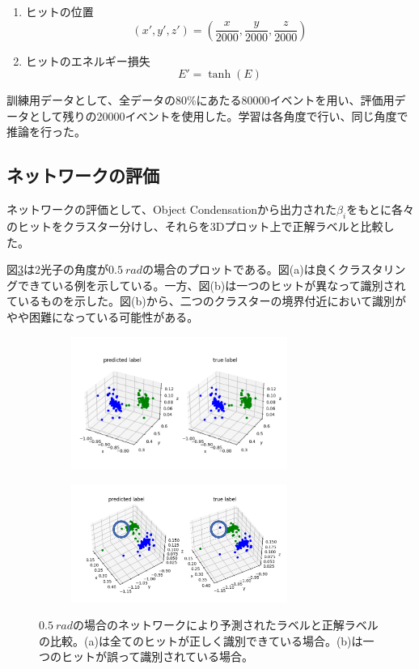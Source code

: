 \begin{enumerate}
\item ヒットの位置
\[
(x',y',z') = \left(\frac{x}{2000},\frac{y}{2000},\frac{z}{2000}\right) 
\]
\item ヒットのエネルギー損失
\[
E' = \tanh(E)
\]
\end{enumerate}
訓練用データとして、全データの80\%にあたる80000イベントを用い、評価用データとして残りの20000イベントを使用した。学習は各角度で行い、同じ角度で推論を行った。

\subsection{ネットワークの評価}
ネットワークの評価として、Object Condensationから出力された$\beta_i$をもとに各々のヒットをクラスター分けし、それらを3Dプロット上で正解ラベルと比較した。

図\ref{DoublePG_5_res}は2光子の角度が$\SI{0.5}{rad}$の場合のプロットである。図(a)は良くクラスタリングできている例を示している。一方、図(b)は一つのヒットが異なって識別されているものを示した。図(b)から、二つのクラスターの境界付近において識別がやや困難になっている可能性がある。

\begin{figure}[H]
	\begin{subfigure}{.5\textwidth}
		\begin{center}
 		 	\includegraphics[width=200pt]{./Figure/DLAnalysis/Double5_1.png}%
  			\caption{}
  			\label{DPG_res_a}
 		\end{center}
	\end{subfigure}
	\begin{subfigure}{.5\textwidth}
		\begin{center}
			\includegraphics[width=200pt]{./Figure/DLAnalysis/Double5_2.png}%
			\caption{}
			\label{DPG_res_b}
		\end{center}
	\end{subfigure}
	\caption[$\SI{0.5}{rad}$の場合の比較]{$\SI{0.5}{rad}$の場合のネットワークにより予測されたラベルと正解ラベルの比較。(a)は全てのヒットが正しく識別できている場合。(b)は一つのヒットが誤って識別されている場合。}
	\label{DoublePG_5_res}
\end{figure}

